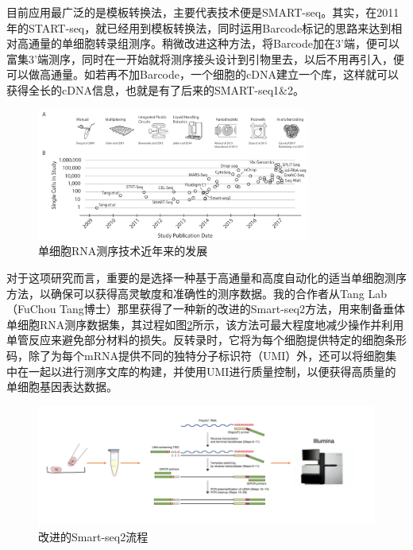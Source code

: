   目前应用最广泛的是模板转换法，主要代表技术便是SMART-seq\cite{ramskold2012full,picelli2013smart}。其实，在2011年的START-seq\cite{islam2011characterization}，就已经用到模板转换法，同时运用Barcode标记的思路来达到相对高通量的单细胞转录组测序。稍微改进这种方法，将Barcode加在3'端，便可以富集3'端测序，同时在一开始就将测序接头设计到引物里去，以后不用再引入，便可以做高通量。如若再不加Barcode，一个细胞的cDNA建立一个库，这样就可以获得全长的cDNA信息，也就是有了后来的SMART-seq1\&2。

\begin{figure}[!htb]
  \centering
  \includegraphics[width=0.8\textwidth]{figs/scseq-development.jpeg}
  \caption{单细胞RNA测序技术近年来的发展}
  \label{fig:scseq-development}
\end{figure}

  对于这项研究而言，重要的是选择一种基于高通量和高度自动化的适当单细胞测序方法，以确保可以获得高灵敏度和准确性的测序数据。我的合作者从Tang Lab（FuChou Tang博士）那里获得了一种新的改进的Smart-seq2方法，用来制备垂体单细胞RNA测序数据集，其过程如图\ref{fig:scseq-smart}所示，该方法可最大程度地减少操作并利用单管反应来避免部分材料的损失。反转录时，它将为每个细胞提供特定的细胞条形码，除了为每个mRNA提供不同的独特分子标识符（UMI）外，还可以将细胞集中在一起以进行测序文库的构建，并使用UMI进行质量控制，以便获得高质量的单细胞基因表达数据。

\begin{figure}[!htb]
  \centering
  \includegraphics[width=1.0\textwidth]{figs/scseq-smart.png}
  \caption{改进的Smart-seq2流程}
  \label{fig:scseq-smart}
\end{figure}

